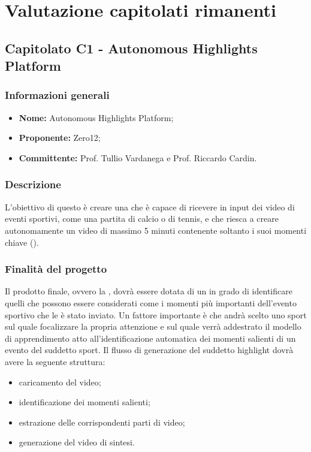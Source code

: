 \section{Valutazione capitolati rimanenti}
    \subsection{Capitolato C1 - Autonomous Highlights Platform}
       \subsubsection{Informazioni generali}
       \begin{itemize}
           \item \textbf{Nome:} Autonomous Highlights Platform;
           \item \textbf{Proponente: }Zero12;
           \item \textbf{Committente: }Prof. Tullio Vardanega e Prof. Riccardo Cardin.
       \end{itemize}

    \subsubsection{Descrizione}
        L'obiettivo di questo  è creare una  che è capace di ricevere in input dei video di eventi sportivi, come una partita di calcio o di tennis, e che riesca a creare autonomamente un video di massimo 5 minuti contenente soltanto i suoi momenti chiave ().

    \subsubsection{Finalità del progetto}
        Il prodotto finale, ovvero la , dovrà essere dotata di un  in grado di identificare quelli che possono essere considerati come i momenti più importanti dell'evento sportivo che le è stato inviato. Un fattore importante è che andrà scelto uno sport sul quale focalizzare la propria attenzione e sul quale verrà addestrato il modello di apprendimento atto all'identificazione automatica dei momenti salienti di un evento del suddetto sport.
        Il flusso di generazione del suddetto highlight dovrà avere la seguente struttura:
        \begin{itemize}
            \item caricamento del video;
            \item identificazione dei momenti salienti;
            \item estrazione delle corrispondenti parti di video;
            \item generazione del video di sintesi.
        \end{itemize}
